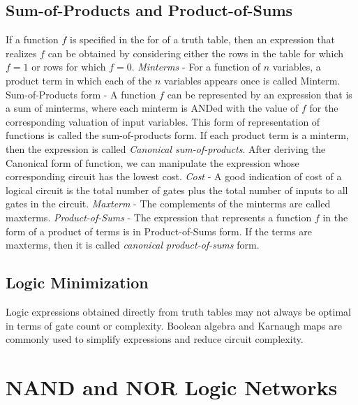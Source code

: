 \documentclass{article}
\begin{document}
\subsection{Sum-of-Products and Product-of-Sums}
If a function $f$ is specified in the for of a truth table, then an expression that realizes $f$ can be obtained by considering either the rows in the table for which $f=1$ or rows for which $f=0$.\newline\newline
\textit{Minterms} - For a function of $n$ variables, a product term in which each of the $n$ variables appears once is called Minterm.\newline\newline
Sum-of-Products form - A function $f$ can be represented by an expression that is a sum of minterms, where each minterm is ANDed with the value of $f$ for the corresponding valuation of input variables. This form of representation of functions is called the sum-of-products form. If each product term is a minterm, then the expression is called \textit{Canonical sum-of-products}. After deriving the Canonical form of function, we can manipulate the expression whose corresponding circuit has the lowest cost.\newline\newline
\textit{Cost} - A good indication of cost of a logical circuit is the total number of gates plus the total number of inputs to all gates in the circuit.\newline\newline
\textit{Maxterm} - The complements of the minterms are called maxterms.\newline\newline
\textit{Product-of-Sums} - The expression that represents a function $f$ in the form of a product of terms is in Product-of-Sums form. If the terms are maxterms, then it is called \textit{ canonical product-of-sums} form.\newline\newline

\subsection{Logic Minimization}
Logic expressions obtained directly from truth tables may not always be optimal in terms of gate count or complexity. Boolean algebra and Karnaugh maps are commonly used to simplify expressions and reduce circuit complexity.

\section{NAND and NOR Logic Networks}
\end{document}

